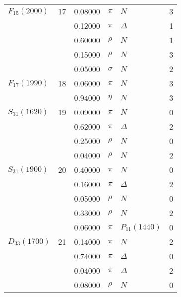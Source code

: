 \documentclass[a4paper,10pt]{article}
\begin{document}
\begin{tabular}[t]{|lr|l|ll|l|} 
\hline
$      F_{15}(2000)  $& 17& 0.08000&$ \pi                 $ &$ N                   $& 3\\
$                    $&   & 0.12000&$ \pi                 $ &$ \Delta              $& 1\\
$                    $&   & 0.60000&$ \rho                $ &$ N                   $& 1\\
$                    $&   & 0.15000&$ \rho                $ &$ N                   $& 3\\
$                    $&   & 0.05000&$ \sigma              $ &$ N                   $& 2\\
\hline
$      F_{17}(1990)  $& 18& 0.06000&$ \pi                 $ &$ N                   $& 3\\
$                    $&   & 0.94000&$ \eta                $ &$ N                   $& 3\\
\hline
$      S_{31}(1620)  $& 19& 0.09000&$ \pi                 $ &$ N                   $& 0\\
$                    $&   & 0.62000&$ \pi                 $ &$ \Delta              $& 2\\
$                    $&   & 0.25000&$ \rho                $ &$ N                   $& 0\\
$                    $&   & 0.04000&$ \rho                $ &$ N                   $& 2\\
\hline
$      S_{31}(1900)  $& 20& 0.40000&$ \pi                 $ &$ N                   $& 0\\
$                    $&   & 0.16000&$ \pi                 $ &$ \Delta              $& 2\\
$                    $&   & 0.05000&$ \rho                $ &$ N                   $& 0\\
$                    $&   & 0.33000&$ \rho                $ &$ N                   $& 2\\
$                    $&   & 0.06000&$ \pi                 $ &$ P_{11}(1440)        $& 0\\
\hline
$      D_{33}(1700)  $& 21& 0.14000&$ \pi                 $ &$ N                   $& 2\\
$                    $&   & 0.74000&$ \pi                 $ &$ \Delta              $& 0\\
$                    $&   & 0.04000&$ \pi                 $ &$ \Delta              $& 2\\
$                    $&   & 0.08000&$ \rho                $ &$ N                   $& 0\\

\end{tabular}
\end{document}
